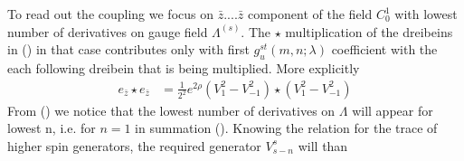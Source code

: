 \documentclass[prd,superscriptaddress,twocolumn,10pt]{revtex4}
\begin{document}
To read out the coupling we focus on $\bar{z}....\bar{z}$ component of the field $C_0^1$ with lowest number of derivatives on gauge field $\Lambda^{(s)}$. The $\star$ multiplication of the dreibeins in () in that case contributes only with first $g_{u}^{st}(m,n;\lambda)$  coefficient with the each following dreibein that is being multiplied. More explicitly 
\begin{align}
e_{\bar{z}}\star e_{\bar{z}}&=\frac{1}{2^2}e^{2\rho}\left(V_1^2-V_{-1}^2\right)\star(V_{1}^2-V_{-1}^2)
\end{align}
From () we notice that the lowest number of derivatives on $\Lambda$ will appear for lowest n, i.e.  for $n=1$ in summation (). Knowing the relation for the trace of higher spin generators, the required generator $V^s_{s-n}$ will than
\end{document}
